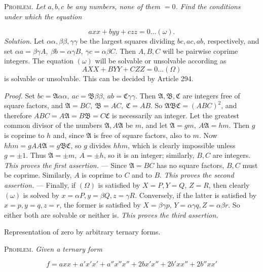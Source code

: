 \textsc{Problem.} \textit{Let \(a,b,c\) be any numbers, none of them \(=0\). Find the conditions under which the equation}

\[axx+byy+czz=0\ldots(\omega).\]
\textit{Solution.} Let \(\alpha\alpha,\beta\beta,\gamma\gamma\) be the largest squares dividing \(bc,ac,ab\), respectively, and set \(\alpha a=\beta\gamma A,\ \beta b=\alpha\gamma B,\ \gamma c=\alpha\beta C\). Then \(A,B,C\) will be pairwise coprime integers. The equation \((\omega)\) will be solvable or unsolvable according as
\[AXX+BYY+CZZ=0\ldots(\Omega)\]
is solvable or unsolvable. This can be decided by Article 294.

\textit{Proof.} Set \(bc=\mathfrak A\alpha\alpha,\ ac=\mathfrak B\beta\beta,\ ab=\mathfrak C\gamma\gamma\). Then \(\mathfrak A,\mathfrak B,\mathfrak C\) are integers free of square factors, and \(\mathfrak A=BC,\ \mathfrak B=AC,\ \mathfrak C=AB\). So \(\mathfrak A\mathfrak B\mathfrak C=(ABC)^2\), and therefore \(ABC=A\mathfrak A=B\mathfrak B=C\mathfrak C\) is necessarily an integer. Let the greatest common divisor of the numbers \(\mathfrak A,A\mathfrak A\) be \(m\), and let \(\mathfrak A=gm,\ A\mathfrak A=hm\). Then \(g\) is coprime to \(h\) and, since \(\mathfrak A\) is free of square factors, also to \(m\). Now \(hhm=gAA\mathfrak A =g\mathfrak B\mathfrak C\), so \(g\) divides \(hhm\), which is clearly impossible unless \(g=\pm1\). Thus \(\mathfrak A=\pm m,\ A=\pm h\), so it is an integer; similarly, \(B,C\) are integers. \textit{This proves the first assertion.} — Since \(\mathfrak A=BC\) has no square factors, \(B,C\) must be coprime. Similarly, \(A\) is coprime to \(C\) and to \(B\). \textit{This proves the second assertion.} — Finally, if \((\Omega)\) is satisfied by \(X=P,Y=Q\), \(Z=R\), then clearly \((\omega)\) is solved by \(x=\alpha P,y=\beta Q,z=\gamma R\). Conversely, if the latter is satisfied by \(x=p,y=q,z=r\), the former is satisfied by \(X=\beta\gamma p\), \(Y=\alpha\gamma q,Z=\alpha\beta r\). So either both are solvable or neither is. \textit{This proves the third assertion.}

\begin{center}Representation of zero by arbitrary ternary forms.\end{center}


\textsc{Problem.} \textit{Given a ternary form}

\[f=axx+a'x'x'+a''x''x''+2bx'x''+2b'xx''+2b''xx'\]

